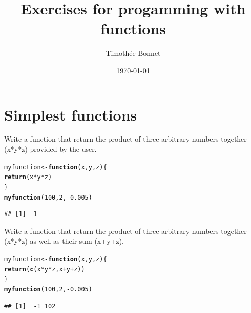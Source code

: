 \documentclass[12pt,a4paper]{scrartcl}\usepackage[]{graphicx}\usepackage[]{color}
\title{Exercises for progamming with functions}
\date{\today}
\author{Timoth\'ee Bonnet}
\makeatletter
\newcommand{\hlnum}[1]{\textcolor[rgb]{0.686,0.059,0.569}{#1}}%
\newcommand{\hlopt}[1]{\textcolor[rgb]{0,0,0}{#1}}%
\newcommand{\hlstd}[1]{\textcolor[rgb]{0.345,0.345,0.345}{#1}}%
\newcommand{\hlkwa}[1]{\textcolor[rgb]{0.161,0.373,0.58}{\textbf{#1}}}%
\newcommand{\hlkwb}[1]{\textcolor[rgb]{0.69,0.353,0.396}{#1}}%
\newcommand{\hlkwc}[1]{\textcolor[rgb]{0.333,0.667,0.333}{#1}}%
\newcommand{\hlkwd}[1]{\textcolor[rgb]{0.737,0.353,0.396}{\textbf{#1}}}%
\newenvironment{kframe}{%
 \def\at@end@of@kframe{}%
 \ifinner\ifhmode%
  \def\at@end@of@kframe{\end{minipage}}%
  \begin{minipage}{\columnwidth}%
 \fi\fi%
 \def\FrameCommand##1{\hskip\@totalleftmargin \hskip-\fboxsep
 \colorbox{shadecolor}{##1}\hskip-\fboxsep
     \hskip-\linewidth \hskip-\@totalleftmargin \hskip\columnwidth}%
 \MakeFramed {\advance\hsize-\width
   \@totalleftmargin\z@ \linewidth\hsize
   \@setminipage}}%
 {\par\unskip\endMakeFramed%
 \at@end@of@kframe}
\newenvironment{knitrout}{}{} %
\makeatother
\begin{document}
\maketitle

\tableofcontents
\ListOfExerciseInToc
{}

\clearpage

\section{Simplest functions}

\begin{Exercise}[difficulty=1, title={Build a first function}]
Write a function that return the product of three arbitrary numbers together (x*y*z) provided by the user.
\end{Exercise}
\begin{Answer}
\begin{knitrout}
\color{fgcolor}\begin{kframe}
\begin{alltt}
\hlstd{myfunction} \hlkwb{<-} \hlkwa{function}\hlstd{(}\hlkwc{x}\hlstd{,}\hlkwc{y}\hlstd{,}\hlkwc{z}\hlstd{)\{}
  \hlkwd{return}\hlstd{(x}\hlopt{*}\hlstd{y}\hlopt{*}\hlstd{z)}
\hlstd{\}}
\hlkwd{myfunction}\hlstd{(}\hlnum{100}\hlstd{,}\hlnum{2}\hlstd{,} \hlopt{-}\hlnum{0.005}\hlstd{)}
\end{alltt}
\begin{verbatim}
## [1] -1
\end{verbatim}
\end{kframe}
\end{knitrout}
\end{Answer}

\begin{Exercise}[difficulty=2, title={Multiple values in output}]
Write a function that return the product of three arbitrary numbers together (x*y*z) as well as their sum (x+y+z).
\end{Exercise}
\begin{Answer}
\begin{knitrout}
\color{fgcolor}\begin{kframe}
\begin{alltt}
\hlstd{myfunction} \hlkwb{<-} \hlkwa{function}\hlstd{(}\hlkwc{x}\hlstd{,}\hlkwc{y}\hlstd{,}\hlkwc{z}\hlstd{)\{}
  \hlkwd{return}\hlstd{(}\hlkwd{c}\hlstd{(x}\hlopt{*}\hlstd{y}\hlopt{*}\hlstd{z, x}\hlopt{+}\hlstd{y}\hlopt{+}\hlstd{z))}
\hlstd{\}}
\hlkwd{myfunction}\hlstd{(}\hlnum{100}\hlstd{,}\hlnum{2}\hlstd{,} \hlopt{-}\hlnum{0.005}\hlstd{)}
\end{alltt}
\begin{verbatim}
## [1]  -1 102
\end{verbatim}
\end{kframe}
\end{knitrout}
\end{Answer}
\end{document}

